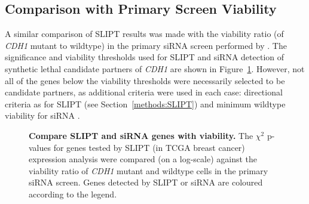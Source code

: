 \FloatBarrier

\subsection{Comparison with Primary Screen Viability} \label{chapt3:compare_viability}

A similar comparison of \gls{SLIPT} results was made with the viability ratio (of \textit{CDH1} mutant to wildtype) in the primary \gls{siRNA} screen performed by \citet{Telford2015}. The significance and viability thresholds used for \gls{SLIPT} and \gls{siRNA} detection of synthetic lethal candidate partners of \textit{CDH1} are shown in Figure~\ref{fig:compare_points_viability_SL}. However, not all of the genes below the viability  thresholds were necessarily selected to be candidate partners, as additional criteria were used in each case: directional criteria as for \gls{SLIPT} (see Section~\ref{methods:SLIPT}) and minimum wildtype viability for \gls{siRNA} \citep{Telford2015}.

\begin{figure}[!htp]
\begin{center}
   \end{center}
   \caption[Compare SLIPT and siRNA genes with viability]{\small \textbf{Compare \gls{SLIPT} and \gls{siRNA} genes with viability.} The $\chi^2$ p-values for genes tested by \gls{SLIPT} (in TCGA breast cancer) expression analysis were compared (on a log-scale) against the viability ratio of \textit{CDH1} mutant and wildtype cells in the primary \gls{siRNA} screen. Genes detected by \gls{SLIPT} or \gls{siRNA} are coloured according to the legend.%
}
\label{fig:compare_points_viability_SL}
\end{figure}

